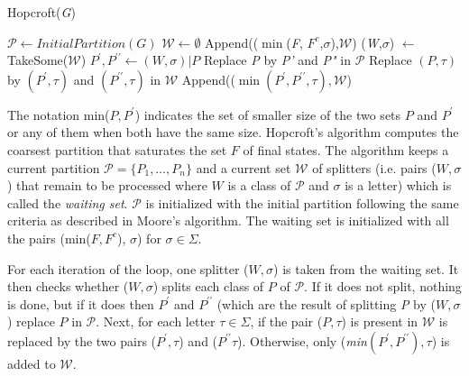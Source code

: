 {\begin{algorithm} 
  \caption{Hopcroft(\textit{G})\label{alg:hop}}
    \begin{algorithmic}[1]
      \State $\mathcal{P} \leftarrow InitialPartition(G)$
      \State $\mathcal{W} \leftarrow \emptyset$
      \ForAll{$\sigma \in \Sigma$}
      	\State Append(($\min$(\textit{F}, $F^c$,$\sigma$),$\mathcal{W}$)
      		\State (\textit{W},$\sigma$) $\leftarrow$ TakeSome($\mathcal{W}$)
				\State $P^{\prime}, P^{\prime\prime} \leftarrow (W,\sigma)|P$      		
				Replace \textit{P} by \textit{P'} and \textit{P"} in $\mathcal{P}$
				\ForAll{$\tau \in \Sigma$}
						\State Replace $(P,\tau)$ by $(P^{\prime},\tau)$ and $(P^{\prime\prime},\tau)$ in $\mathcal{W}$
					\Else
						\State Append(($\min(P^{\prime}, P^{\prime\prime},\tau),\mathcal{W}$)				
					\EndIf				
				\EndFor 
      		\EndFor
      	\EndWhile
      \EndFor
    \end{algorithmic}
  \end{algorithm}

The notation min($P,P^{\prime}$) indicates the set of smaller size of the two sets $P$ and $P^{\prime}$ or any of them when both have the same size. Hopcroft's algorithm computes the coarsest partition that saturates the set $F$ of final states. The algorithm keeps a current partition $\mathcal{P} = \{P_1, \ldots, P_n\}$ and a current set $\mathcal{W}$ of splitters (i.e. pairs ($W, \sigma$) that remain to be processed where $W$ is a class of $\mathcal{P}$ and $\sigma$ is a letter) which is called the \textit{waiting set}. $\mathcal{P}$ is initialized with the initial partition following the same criteria as described in Moore's algorithm. The waiting set is initialized with all the pairs (min($F, F^c$), $\sigma$) for $\sigma\in\Sigma$.

For each iteration of the loop, one splitter ($W,\sigma$) is taken from the waiting set. It then checks whether ($W, \sigma$) splits each class of $P$ of $\mathcal{P}$. If it does not split, nothing is done, but if it does then $P^{\prime}$ and $P^{\prime\prime}$ (which are the result of splitting \textit{P} by ($W,\sigma$) replace $P$ in $\mathcal{P}$. Next, for each letter $\tau\in\Sigma$, if the pair ($P,\tau$) is present in $\mathcal{W}$ is replaced by the two pairs ($P^{\prime},\tau$) and ($P^{\prime\prime}\tau$). Otherwise, only (\textit{min}$(P^{\prime},P^{\prime\prime}),\tau$) is added to $\mathcal{W}$.

}
